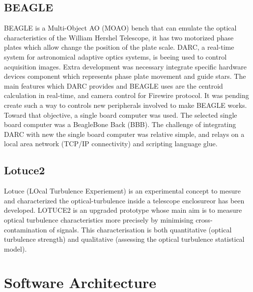 \documentclass[]{spie}  %
\begin{document}
\subsection{BEAGLE}
BEAGLE is a Multi-Object AO (MOAO) bench that can emulate the optical
characteristics of the William Hershel Telescope, it has two motorized phase
plates which allow change the position of the plate scale. DARC, a real-time
system for astronomical adaptive optics systems, is beeing used to control
acquisition images. Extra development was necessary integrate specific hardware
devices component which represents phase plate movement and guide stars. The
main features which DARC provides and BEAGLE uses are the centroid calculation
in real-time\cite{basden2012wavefront}, and camera control for Firewire
protocol. It was pending create such a way to controls new peripherals involved
to make BEAGLE works. Toward that objective, a single board computer was used.
The selected single board computer was a BeagleBone Back (BBB). The challenge
of integrating DARC with new the single board computer was relative simple, and
relays on a local area network (TCP/IP connectivity) and scripting language
glue. 


\subsection{Lotuce2}
Lotuce (LOcal Turbulence Experiement)\cite{ziad1a2013lotuce} is an experimental
concept to mesure and characterized the optical-turbulence inside a telescope
enclosureor has been developed\cite{berdja1afirst}. LOTUCE2 is an upgraded
prototype whose main aim is to measure optical turbulence characteristics more
precisely by minimising cross-contamination of signals. This characterisation
is both quantitative (optical turbulence strength) and qualitative (assessing
the optical turbulence statistical model). 


\section{Software Architecture}\label{sec:SWA} 
\end{document}
